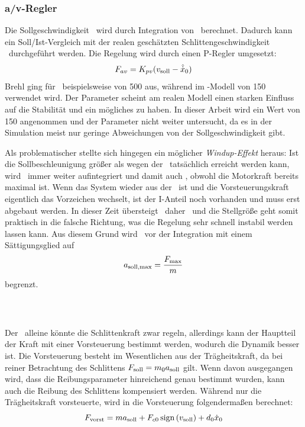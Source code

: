 \subsubsection{a/v-Regler}\label{sec:avr}
Die Sollgeschwindigkeit \vsoll\ wird durch Integration von \asoll\ berechnet.
Dadurch kann ein Soll/Ist-Vergleich mit der realen \bzw geschätzten Schlittengeschwindigkeit \xop\ durchgeführt werden.
Die Regelung wird durch einen P-Regler umgesetzt:
	\[
	F_{av}= K_{pv} (v_{\mathrm{soll}}-\hat{\dot{x}}_0)
\]
Brehl \cite{brehl} ging für \kpv\ beispielsweise von 500 aus, während im \sm-Modell von \cite{chang} 150 verwendet wird.
Der Parameter scheint am realen Modell einen starken Einfluss auf die Stabilität und ein mögliches  zu haben.
In dieser Arbeit wird ein Wert von 150 angenommen und der Parameter nicht weiter untersucht, da es in der Simulation meist nur geringe Abweichungen von der Sollgeschwindigkeit gibt.

Als problematischer stellte sich hingegen ein möglicher \emph{Windup-Effekt} heraus: 
Ist die Sollbeschleunigung größer als wegen der \sgb\ tatsächlich erreicht werden kann, wird \vsoll\ immer weiter aufintegriert und damit auch \fav, obwohl die Motorkraft bereits maximal ist. 
Wenn das System wieder aus der \sgb\ ist und die Vorsteuerungskraft eigentlich das Vorzeichen wechselt, ist der I-Anteil noch vorhanden und muss erst abgebaut werden.
In dieser Zeit übersteigt \fav\ daher \fvorst\ und die Stellgröße geht somit praktisch in die falsche Richtung, was die Regelung sehr schnell instabil werden lassen kann.
Aus diesem Grund wird \asoll\ vor der Integration mit einem Sättigungsglied auf 
	\[
	a_{\mathrm{soll,max}}=\frac{F_{\mathrm{max}}}{m}
\] 
begrenzt.

\subsubsection{\vorst\  }\label{sec:vorstmcd}
Der \avr\ alleine könnte die Schlittenkraft zwar regeln, allerdings kann der Hauptteil der Kraft mit einer Vorsteuerung bestimmt werden, wodurch die Dynamik besser ist.
Die Vorsteuerung besteht im Wesentlichen aus der Trägheitskraft, da bei reiner Betrachtung des Schlittens $F_{\mathrm{soll}}=m_0 a_{\mathrm{soll}}$ gilt. 
Wenn davon ausgegangen wird, dass die Reibungsparameter hinreichend genau bestimmt wurden, kann auch die Reibung des Schlittens kompensiert werden.
Während \cite{brehl} nur die Trägheitskraft vorsteuerte, wird in \cite{chang} die Vorsteuerung folgendermaßen berechnet:
	\[
	F_{\mathrm{vorst}}=m a_{\mathrm{soll}} + F_{c0} \, \mathrm{sign}\left(v_{\mathrm{soll}}\right) + d_0 \dot{x}_0
\]

